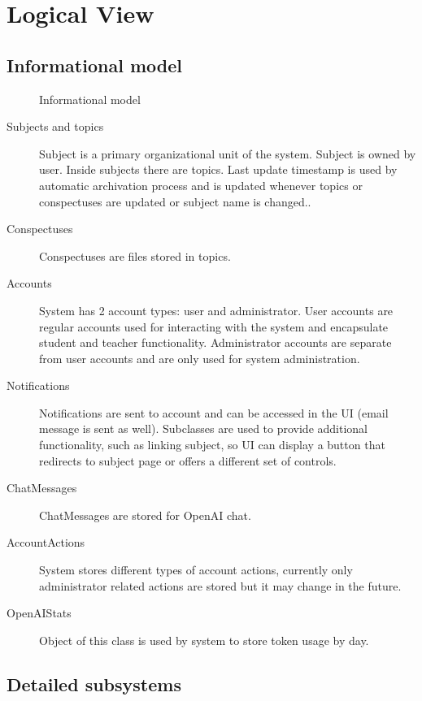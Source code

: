 \documentclass[
    english, %
]{VUMIFPSkursinis}
\begin{document}
\section{Logical View}

\subsection{Informational model}

\begin{figure}[ht]
    \centering
    
    \label{informational-model}
    \caption{Informational model}
\end{figure}

\begin{description}
    \item[Subjects and topics] Subject is a primary organizational unit of the system. Subject is owned by user. Inside subjects there are topics. Last update timestamp is used by automatic archivation process and is updated whenever topics or conspectuses are updated or subject name is changed..
    \item[Conspectuses] Conspectuses are files stored in topics.
    \item[Accounts] System has 2 account types: user and administrator. User accounts are regular accounts used for interacting with the system and encapsulate student and teacher functionality. Administrator accounts are separate from user accounts and are only used for system administration.
    \item[Notifications] Notifications are sent to account and can be accessed in the UI (email message is sent as well). Subclasses are used to provide additional functionality, such as linking subject, so UI can display a button that redirects to subject page or offers a different set of controls.
    \item[ChatMessages] ChatMessages are stored for OpenAI chat.
    \item[AccountActions] System stores different types of account actions, currently only administrator related actions are stored but it may change in the future.
    \item[OpenAIStats] Object of this class is used by system to store token usage by day.
\end{description}

\subsection{Detailed subsystems}
\end{document}
